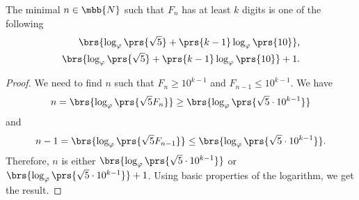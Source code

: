 \documentclass[10pt]{article}
\begin{document}
\begin{corollary}
The minimal $n \in \mbb{N}$ such that $F_n$ has at least $k$ digits is one of the following
\begin{align*}
\brs{\log_{\varphi}\prs{\sqrt{5}} + \prs{k-1}\log_{\varphi}\prs{10}} \text{,} \\
\brs{\log_{\varphi}\prs{\sqrt{5}} + \prs{k-1}\log_{\varphi}\prs{10}} + 1 \text{.}
\end{align*}
\end{corollary}

\begin{proof}
We need to find $n$ such that $F_n \geq 10^{k-1}$ and $F_{n-1} \leq 10^{k-1}$. We have
\begin{align*}
n = \brs{\log_\varphi\prs{\sqrt{5} F_n}} \geq \brs{\log_\varphi\prs{\sqrt{5} \cdot 10^{k-1}}}
\end{align*}
and
\begin{align*}
n-1 = \brs{\log_\varphi\prs{\sqrt{5}F_{n-1}}} \leq \brs{\log_\varphi\prs{\sqrt{5} \cdot 10^{k-1}}} \text{.}
\end{align*}
Therefore, $n$ is either $\brs{\log_\varphi\prs{\sqrt{5} \cdot 10^{k-1}}}$ or $\brs{\log_\varphi\prs{\sqrt{5} \cdot 10^{k-1}}} + 1$.
Using basic properties of the logarithm, we get the result.
\end{proof}

\printbibliography
\end{document}
